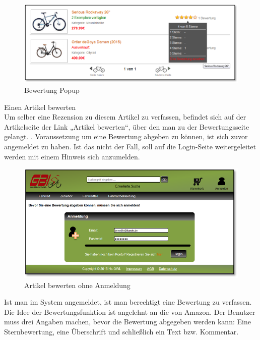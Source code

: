 \begin{figure}[H]
\begin{center}
\includegraphics[width=12cm]{Bilder/Michael_Abbildung10-BewertungPopup.png}
\end{center}
\caption{Bewertung Popup}
\end{figure}

Einen Artikel bewerten
\\
Um selber eine Rezension zu diesem Artikel zu verfassen, befindet sich auf der Artikelseite der Link „Artikel bewerten“, über den man zu der Bewertungsseite gelangt. 
. Voraussetzung um eine Bewertung abgeben zu können, ist sich zuvor angemeldet zu haben. Ist das nicht der Fall, soll auf die Login-Seite weitergeleitet werden mit einem Hinweis sich anzumelden.

\begin{figure}[H]
\begin{center}
\includegraphics[width=12cm]{Bilder/Michael_Abbildung11-ArtikelBewertenOhneAnmeldung.png}
\end{center}
\caption{Artikel bewerten ohne Anmeldung}
\end{figure}

Ist man im System angemeldet, ist man berechtigt eine Bewertung zu verfassen.
Die Idee der Bewertungsfunktion ist angelehnt an die von Amazon. Der Benutzer muss drei Angaben machen, bevor die Bewertung abgegeben werden kann: Eine Sternbewertung, eine Überschrift und schließlich ein Text bzw. Kommentar. 

